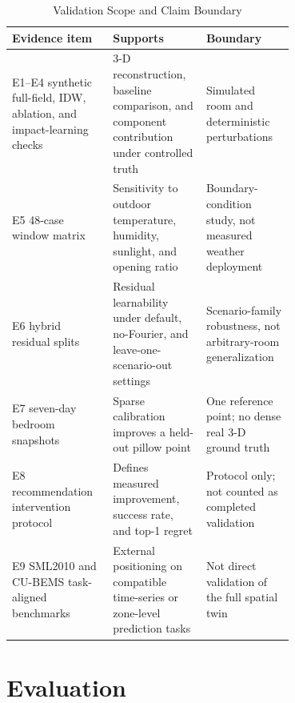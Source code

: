 \documentclass[conference]{IEEEtran}
\begin{document}
\begin{table}[t]
\caption{Validation Scope and Claim Boundary}
\label{tab:claim_scope}
\centering
\scriptsize
\begin{tabular}{|P{0.23\linewidth}|P{0.24\linewidth}|P{0.23\linewidth}|}
\hline
Evidence item & Supports & Boundary\\
\hline
E1--E4 synthetic full-field, IDW, ablation, and impact-learning checks & 3-D reconstruction, baseline comparison, and component contribution under controlled truth & Simulated room and deterministic perturbations\\
\hline
E5 48-case window matrix & Sensitivity to outdoor temperature, humidity, sunlight, and opening ratio & Boundary-condition study, not measured weather deployment\\
\hline
E6 hybrid residual splits & Residual learnability under default, no-Fourier, and leave-one-scenario-out settings & Scenario-family robustness, not arbitrary-room generalization\\
\hline
E7 seven-day bedroom snapshots & Sparse calibration improves a held-out pillow point & One reference point; no dense real 3-D ground truth\\
\hline
E8 recommendation intervention protocol & Defines measured improvement, success rate, and top-1 regret & Protocol only; not counted as completed validation\\
\hline
E9 SML2010 and CU-BEMS task-aligned benchmarks & External positioning on compatible time-series or zone-level prediction tasks & Not direct validation of the full spatial twin\\
\hline
\end{tabular}
\end{table}

\section{Evaluation}
\end{document}

